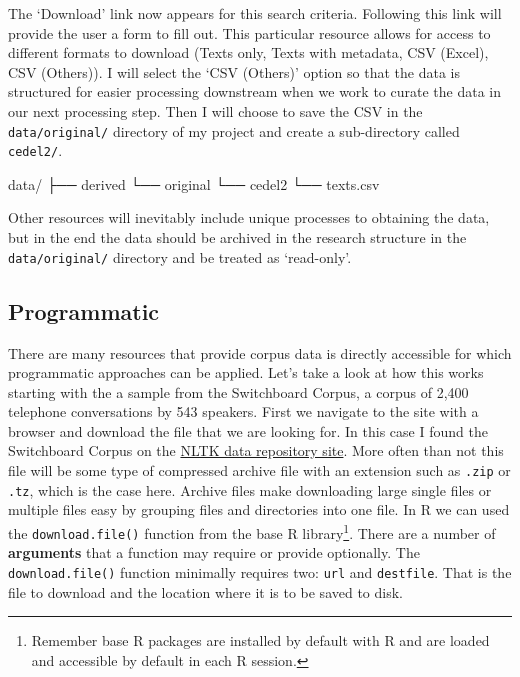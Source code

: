 \documentclass[
  letterpaper,
]{latex/krantz}
\newenvironment{Shaded}{\begin{snugshade}}{\end{snugshade}}
\newcommand{\ExtensionTok}[1]{\textcolor[rgb]{0.00,0.23,0.31}{#1}}
\newcommand{\NormalTok}[1]{\textcolor[rgb]{0.00,0.23,0.31}{#1}}
\begin{document}
The `Download' link now appears for this search criteria. Following this
link will provide the user a form to fill out. This particular resource
allows for access to different formats to download (Texts only, Texts
with metadata, CSV (Excel), CSV (Others)). I will select the `CSV
(Others)' option so that the data is structured for easier processing
downstream when we work to curate the data in our next processing step.
Then I will choose to save the CSV in the \texttt{data/original/}
directory of my project and create a sub-directory called
\texttt{cedel2/}.

\begin{Shaded}
\begin{Highlighting}[]
\ExtensionTok{data/}
\ExtensionTok{├──}\NormalTok{ derived}
\ExtensionTok{└──}\NormalTok{ original}
    \ExtensionTok{└──}\NormalTok{ cedel2}
       \ExtensionTok{└──}\NormalTok{ texts.csv}
\end{Highlighting}
\end{Shaded}

Other resources will inevitably include unique processes to obtaining
the data, but in the end the data should be archived in the research
structure in the \texttt{data/original/} directory and be treated as
`read-only'.

\hypertarget{programmatic}{%
\subsection{Programmatic}\label{programmatic}}

There are many resources that provide corpus data is directly accessible
for which programmatic approaches can be applied. Let's take a look at
how this works starting with the a sample from the Switchboard Corpus, a
corpus of 2,400 telephone conversations by 543 speakers. First we
navigate to the site with a browser and download the file that we are
looking for. In this case I found the Switchboard Corpus on the
\href{http://www.nltk.org/nltk_data/}{NLTK data repository site}. More
often than not this file will be some type of compressed archive file
with an extension such as \texttt{.zip} or \texttt{.tz}, which is the
case here. Archive files make downloading large single files or multiple
files easy by grouping files and directories into one file. In R we can
used the \texttt{download.file()} function from the base R
library\footnote{Remember base R packages are installed by default with
  R and are loaded and accessible by default in each R session.}. There
are a number of \textbf{arguments} that a function may require or
provide optionally. The \texttt{download.file()} function minimally
requires two: \texttt{url} and \texttt{destfile}. That is the file to
download and the location where it is to be saved to disk.
\end{document}
